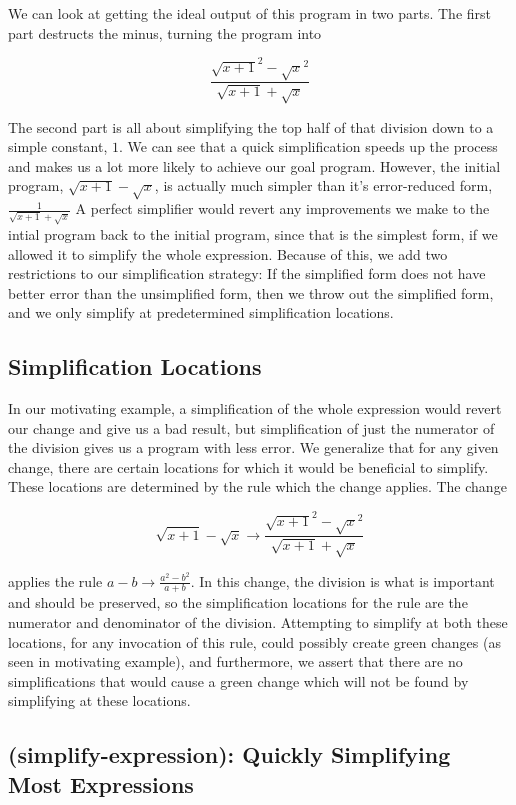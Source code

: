 \documentclass{article}
\newcommand{\sqrsqrt}[1]{\sqrt{#1}^2}
\begin{document}
We can look at getting the ideal output
 of this program 
in two parts. 
The first part destructs the minus, 
turning the program into

\[\frac{\sqrsqrt{x + 1} - \sqrsqrt{x}}{\sqrt{x + 1} + \sqrt{x}}\]

The second part is all about simplifying 
the top half of that division 
down to a simple constant, 
$1$. 
We can see 
that a quick simplification 
speeds up the process 
and makes us a lot more likely 
to achieve our goal program. 
However, the initial program, 
$\sqrt{x + 1} - \sqrt{x}$, 
is actually much simpler 
than it's error-reduced form,
$\frac{1}{\sqrt{x + 1} + \sqrt{x}}$
A perfect simplifier 
would revert any improvements we make 
to the intial program 
back to the initial program, 
since that is the simplest form, 
if we allowed it to simplify the whole expression. 
Because of this, 
we add two restrictions 
to our simplification strategy: 
If the simplified form 
does not have better error 
than the unsimplified form, 
then we throw out 
the simplified form, 
and we only simplify 
at predetermined simplification locations.

\subsection{Simplification Locations}

In our motivating example, 
a simplification of the whole expression 
would revert our change 
and give us a bad result, 
but simplification of just the numerator 
of the division gives us a program with less error. 
We generalize that for any given change, 
there are certain locations 
for which it would be beneficial to simplify. 
These locations are determined 
by the rule which the change applies. 
The change

\[\sqrt{x + 1} - \sqrt{x} \to \frac{\sqrsqrt{x + 1} - \sqrsqrt{x}}{\sqrt{x + 1} + \sqrt{x}}\]

applies the rule 
$a - b \to  \frac{a^2 - b^2}{a + b}$. 
In this change, 
the division is what is important 
and should be preserved, 
so the simplification locations 
for the rule are the numerator 
and denominator of the division. 
Attempting to simplify at both these locations, 
for any invocation of this rule, 
could possibly create green changes 
(as seen in motivating example), 
and furthermore, 
we assert that there are no simplifications 
that would cause a green change 
which will not be found 
by simplifying at these locations.

\subsection{(simplify-expression): Quickly Simplifying Most Expressions}
\end{document}
